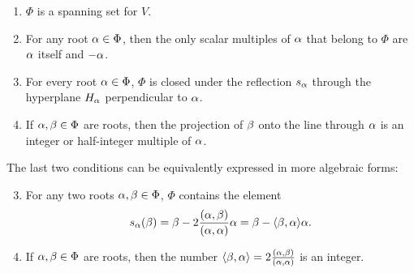         \begin{enumerate}[label=(\roman*)]
            \item $\Phi$ is a spanning set for $V$.
            \item For any root $\alpha \in \Phi$, then the only scalar multiples of $\alpha$ that belong to $\Phi$ are $\alpha$ itself and $-\alpha$.
            \item For every root $\alpha \in \Phi$, $\Phi$ is closed under the reflection $s_{\alpha}$ through the hyperplane $H_{\alpha}$ perpendicular to $\alpha$.
            \item If $\alpha,\beta \in \Phi$ are roots, then the projection of $\beta$ onto the line through $\alpha$ is an integer or half-integer multiple of $\alpha$.
        \end{enumerate}

        The last two conditions can be equivalently expressed in more algebraic forms:

        \begin{enumerate}[label=(\roman*)]
            \setcounter{enumi}{2}
            \item For any two roots $\alpha,\beta \in \Phi$, $\Phi$ contains the element
            \[
                s_{\alpha}(\beta) = \beta-2\frac{(\alpha,\beta)}{(\alpha,\alpha)}\alpha = \beta-\langle\beta,\alpha\rangle\alpha.
            \]
            \item If $\alpha,\beta \in \Phi$ are roots, then the number $\langle\beta,\alpha\rangle = 2\frac{(\alpha,\beta)}{(\alpha,\alpha)}$ is an integer.
        \end{enumerate}
        

